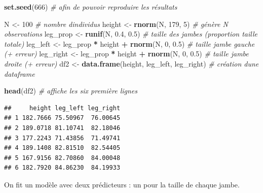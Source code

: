 \documentclass[
  a4paper,11pt,twoside,onecolumn,openright,final,oldfontcommands]{memoir}
\newenvironment{Shaded}{\begin{snugshade}}{\end{snugshade}}
\newcommand{\CommentTok}[1]{\textcolor[rgb]{0.56,0.35,0.01}{\textit{#1}}}
\newcommand{\DecValTok}[1]{\textcolor[rgb]{0.00,0.00,0.81}{#1}}
\newcommand{\FloatTok}[1]{\textcolor[rgb]{0.00,0.00,0.81}{#1}}
\newcommand{\KeywordTok}[1]{\textcolor[rgb]{0.13,0.29,0.53}{\textbf{#1}}}
\newcommand{\NormalTok}[1]{#1}
\newcommand{\OperatorTok}[1]{\textcolor[rgb]{0.81,0.36,0.00}{\textbf{#1}}}
\newcommand{\StringTok}[1]{\textcolor[rgb]{0.31,0.60,0.02}{#1}}
\theoremstyle{definition}
\theoremstyle{definition}
\theoremstyle{definition}
\theoremstyle{remark}
\begin{document}
\begin{Shaded}
\begin{Highlighting}[]
\KeywordTok{set.seed}\NormalTok{(}\DecValTok{666}\NormalTok{) }\CommentTok{\# afin de pouvoir reproduire les résultats}

\NormalTok{N \textless{}{-}}\StringTok{ }\DecValTok{100} \CommentTok{\# nombre d\textquotesingle{}individus}
\NormalTok{height \textless{}{-}}\StringTok{ }\KeywordTok{rnorm}\NormalTok{(N, }\DecValTok{179}\NormalTok{, }\DecValTok{5}\NormalTok{) }\CommentTok{\# génère N observations}
\NormalTok{leg\_prop \textless{}{-}}\StringTok{ }\KeywordTok{runif}\NormalTok{(N, }\FloatTok{0.4}\NormalTok{, }\FloatTok{0.5}\NormalTok{) }\CommentTok{\# taille des jambes (proportion taille totale)}
\NormalTok{leg\_left \textless{}{-}}\StringTok{ }\NormalTok{leg\_prop }\OperatorTok{*}\StringTok{ }\NormalTok{height }\OperatorTok{+}\StringTok{ }\KeywordTok{rnorm}\NormalTok{(N, }\DecValTok{0}\NormalTok{, }\FloatTok{0.5}\NormalTok{) }\CommentTok{\# taille jambe gauche (+ erreur)}
\NormalTok{leg\_right \textless{}{-}}\StringTok{ }\NormalTok{leg\_prop }\OperatorTok{*}\StringTok{ }\NormalTok{height }\OperatorTok{+}\StringTok{ }\KeywordTok{rnorm}\NormalTok{(N, }\DecValTok{0}\NormalTok{, }\FloatTok{0.5}\NormalTok{) }\CommentTok{\# taille jambe droite (+ erreur)}
\NormalTok{df2 \textless{}{-}}\StringTok{ }\KeywordTok{data.frame}\NormalTok{(height, leg\_left, leg\_right) }\CommentTok{\# création d\textquotesingle{}une dataframe}

\KeywordTok{head}\NormalTok{(df2) }\CommentTok{\# affiche les six première lignes}
\end{Highlighting}
\end{Shaded}

\begin{verbatim}
##     height leg_left leg_right
## 1 182.7666 75.50967  76.00645
## 2 189.0718 81.10741  82.18046
## 3 177.2243 71.43856  71.49741
## 4 189.1408 82.81510  82.54405
## 5 167.9156 82.70860  84.00048
## 6 182.7920 84.86230  84.19933
\end{verbatim}

On fit un modèle avec deux prédicteurs : un pour la taille de chaque jambe.
\end{document}
